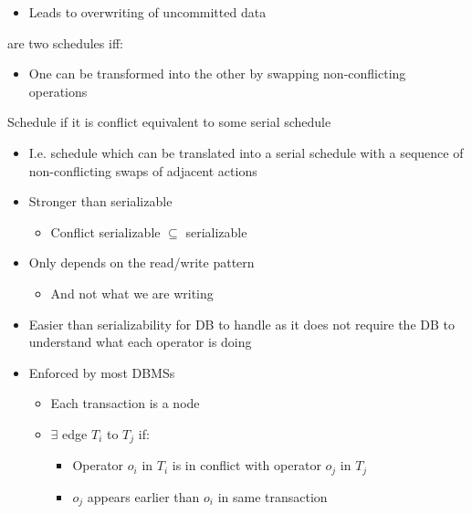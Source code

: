 \begin{itemize}
\begin{itemize}
\begin{itemize}
\begin{itemize}
                            \item Leads to overwriting of uncommitted data
                        \end{itemize}
                \end{itemize}
        \end{itemize}
     are two schedules iff:
        \begin{itemize}
            \item One can be transformed into the other by swapping non-conflicting operations
        \end{itemize}
     Schedule if it is conflict equivalent to some serial schedule
        \begin{itemize}
            \item I.e. schedule which can be translated into a serial schedule with a sequence of non-conflicting swaps of adjacent actions
            \item Stronger than serializable
                \begin{itemize}
                    \item Conflict serializable $\subseteq$ serializable
                \end{itemize}
            \item Only depends on the read/write pattern
                \begin{itemize}
                    \item And not what we are writing
                \end{itemize}
            \item Easier than serializability for DB to handle as it does not require the DB to understand what each operator is doing
            \item Enforced by most DBMSs
                \begin{itemize}
                    \item Each transaction is a node
                    \item $\exists$ edge $T_i$ to $T_j$ if:
                        \begin{itemize}
                            \item Operator $o_i$ in $T_i$ is in conflict with operator $o_j$ in $T_j$
                            \item $o_j$ appears earlier than $o_i$ in same transaction
                        \end{itemize}

\end{itemize}
\end{itemize}
\end{itemize}
